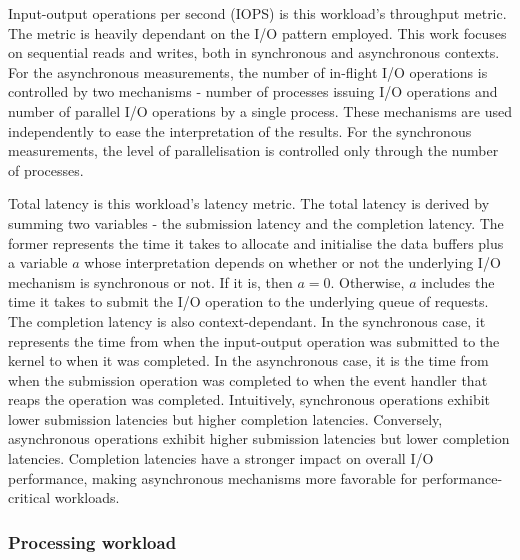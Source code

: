 Input-output operations per second (IOPS) is this workload's throughput metric.
The metric is heavily dependant on the I/O pattern employed. 
This work focuses on sequential reads and writes, both in synchronous and asynchronous contexts.
For the asynchronous measurements, the number of in-flight I/O operations is controlled by 
two mechanisms - number of processes issuing I/O operations and number of parallel I/O operations 
by a single process. These mechanisms are used independently to ease the interpretation of the results.
For the synchronous measurements, the level of parallelisation is controlled only through the number 
of processes.

Total latency is this workload's latency metric. The total latency is derived by summing 
two variables - the submission latency and the completion latency. The former represents 
the time it takes to allocate and initialise the data buffers plus a variable $a$ whose interpretation 
depends on whether or not the underlying I/O mechanism is synchronous or not.  
If it is, then $a = 0$. Otherwise, $a$ includes the time it takes to submit the I/O operation
to the underlying queue of requests. The completion latency is also context-dependant. 
In the synchronous case, it represents the time from when the input-output operation was submitted 
to the kernel to when it was completed. In the asynchronous case, it is the time from 
when the submission operation was completed to when the event handler that reaps the operation 
was completed. Intuitively, synchronous operations exhibit lower submission latencies but higher 
completion latencies. Conversely, asynchronous operations exhibit higher submission latencies 
but lower completion latencies. Completion latencies have a stronger impact on overall 
I/O performance, making asynchronous mechanisms more favorable for performance-critical workloads.   

\subsubsection{Processing workload}

